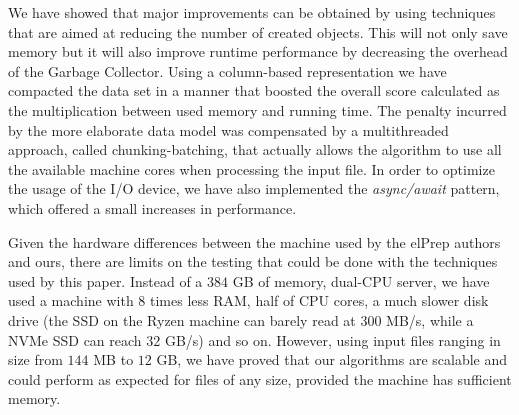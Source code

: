 \documentclass[a4paper,twoside]{article}
\begin{document}
We have showed that major improvements can be obtained by using techniques that are aimed at reducing the number of created objects. This will not only save memory but it will also improve runtime performance by decreasing the overhead of the Garbage Collector.
Using a column-based representation we have compacted the data set in a manner that boosted the overall score calculated as the multiplication between used memory and running time. 
The penalty incurred by the more elaborate data model was compensated by a multithreaded approach, called chunking-batching, that actually allows the algorithm to use all the available machine cores when processing the input file. In order to optimize the usage of the I/O device, we have also implemented the {\it async/await} pattern, which offered a small increases in performance.

Given the hardware differences between the machine used by the elPrep authors and ours, there are limits on the testing that could be done with the techniques used by this paper.
Instead of a $384$ GB of memory, dual-CPU server, we have used a machine  with $8$ times less RAM, half of CPU cores, a much slower disk drive (the SSD on the Ryzen machine can barely read at 300 MB/s, while a NVMe SSD can reach $32$ GB/s) and so on.
However, using input files ranging in size from $144$ MB to $12$ GB, we have proved that our algorithms are scalable and could perform as expected for files of any size, provided the machine has sufficient memory.




{\small
}
\end{document}
